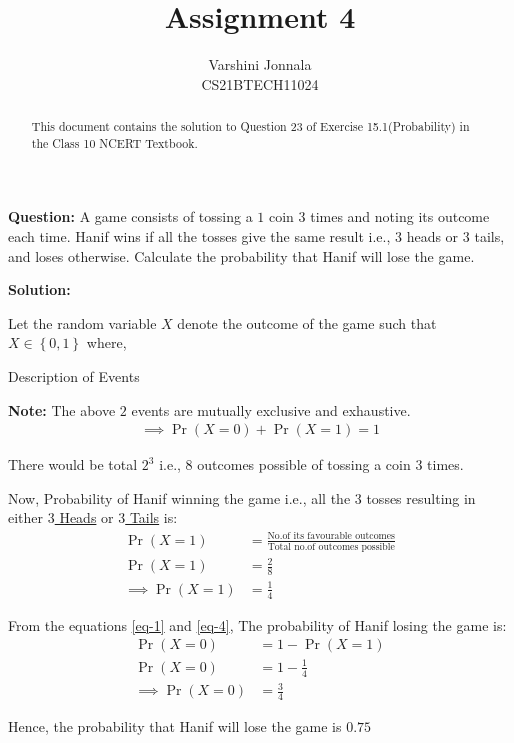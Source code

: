 \documentclass[journal,12pt,twocolumn]{IEEEtran}
\title{Assignment 4}
\author{Varshini Jonnala\\CS21BTECH11024}
\DeclareMathOperator*{\equals}{=}
\providecommand{\pr}[1]{\ensuremath{\Pr\left(#1\right)}}
\providecommand{\cbrak}[1]{\ensuremath{\left\{#1\right\}}}
\newcommand{\solution}{\noindent \textbf{Solution: }}
\newcommand{\note}{\noindent \textbf{Note: }}
\begin{document}
    \maketitle

    \begin{abstract}
    This document contains the solution to Question 23 of Exercise 15.1(Probability) in the Class 10 NCERT Textbook.  
    \end{abstract}
    
    \noindent \textbf{Question: } A game consists of tossing a \rupee$1$ coin $3$ times and noting its outcome each time. Hanif wins if all the tosses give the same result i.e., $3$ heads or $3$ tails, and loses otherwise. Calculate the probability that Hanif will lose the game.
    
    \solution
    
    Let the random variable $X$ denote the outcome of the game such that $X \in \cbrak{0,1}$ where,  
    \begin{table}[ht!]
        \centering
        
    	\caption{Description of Events}
    	\label{Tables:Table}
    \end{table}
    
    \note The above $2$ events are mutually exclusive and exhaustive. 
    \begin{align}
        \implies \pr{X = 0} + \pr{X = 1} \equals 1 \label{eq-1}
    \end{align}
    
    \noindent There would be total $2^3$ i.e., $8$ outcomes possible of tossing a coin $3$ times.  
    
    Now, Probability of Hanif winning the game i.e., all the $3$ tosses resulting in either \underline{$3$ Heads} or \underline{$3$ Tails} is:
    \begin{align}
    \pr{X = 1} &= \frac{\text{No.of its favourable outcomes}}{\text{Total no.of outcomes possible}}\\
    \pr{X=1} &= \frac{2}{8} \\
    \implies \pr{X=1} &= \frac{1}{4} \label{eq-4}
    \end{align}
    
    \noindent From the equations \ref{eq-1} and \ref{eq-4}, The probability of Hanif losing the game is:
    \begin{align}
        \pr{X = 0} &= 1 - \pr{X = 1}\\
        \pr{X = 0} &= 1 - \frac{1}{4}\\
        \implies \pr{X = 0} &= \frac{3}{4}
    \end{align}
    
    Hence, the probability that Hanif will lose the game is \underline{$0.75$} 
\end{document}
